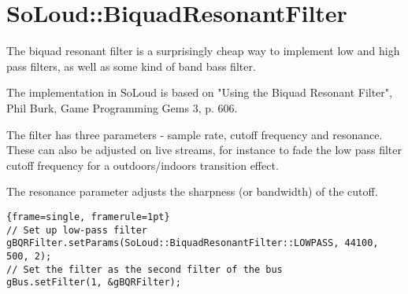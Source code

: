 
\chapter{SoLoud::BiquadResonantFilter}

The biquad resonant filter is a surprisingly cheap way to implement low and high pass filters, as well as some kind of band bass filter.

The implementation in SoLoud is based on "Using the Biquad Resonant Filter", Phil Burk, Game Programming Gems 3, p. 606.

The filter has three parameters - sample rate, cutoff frequency and resonance. These can also be adjusted on live streams, for instance to fade the low pass filter cutoff frequency for a outdoors/indoors transition effect.

The resonance parameter adjusts the sharpness (or bandwidth) of the cutoff.

\begin{lstlisting}{frame=single, framerule=1pt}
// Set up low-pass filter
gBQRFilter.setParams(SoLoud::BiquadResonantFilter::LOWPASS, 44100, 500, 2);  
// Set the filter as the second filter of the bus
gBus.setFilter(1, &gBQRFilter); 
\end{lstlisting}

